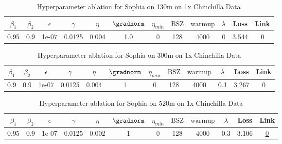 \begin{table}[H]
\centering
\caption{Hyperparameter ablation for Sophia on 130m on 1x Chinchilla Data}
\label{tab:ablation_sophia_130m_1}
\begin{tabular}{cccccccccccc}
\toprule
$\beta_1$ & $\beta_2$ & $\epsilon$ & $\gamma$ & $\eta$ & $\gradnorm$ & $\eta_{min}$ & $\mathrm{BSZ}$ & $\mathrm{warmup}$ & $\lambda$ & Loss & Link \\
\midrule
0.95 & 0.9 & 1e-07 & 0.0125 & 0.004 & 1.0 & 0 & 128 & 4000 & 0 & 3.544 & \href{https://wandb.ai/stanford-mercury/optimizer-scaling/runs/sweep-130m-2B-sophiag67fd60lr0.004-wd0-minlr0-warmup4000-b10.95--7bdb33}{0} \\
\midrule
\bottomrule
\end{tabular}
\end{table}

\begin{table}[H]
\centering
\caption{Hyperparameter ablation for Sophia on 300m on 1x Chinchilla Data}
\label{tab:ablation_sophia_300m_1}
\begin{tabular}{cccccccccccc}
\toprule
$\beta_1$ & $\beta_2$ & $\epsilon$ & $\gamma$ & $\eta$ & $\gradnorm$ & $\eta_{min}$ & $\mathrm{BSZ}$ & $\mathrm{warmup}$ & $\lambda$ & Loss & Link \\
\midrule
0.9 & 0.9 & 1e-07 & 0.0125 & 0.004 & 1 & 0 & 128 & 4000 & 0.1 & 3.267 & \href{https://wandb.ai/stanford-mercury/optimizer-scaling/runs/sweep-300m-6B-sophiafff382flr0.004-wd0.1-minlr0-warmup4000-b10.9-f1648d}{0} \\
\midrule
\bottomrule
\end{tabular}
\end{table}

\begin{table}[H]
\centering
\caption{Hyperparameter ablation for Sophia on 520m on 1x Chinchilla Data}
\label{tab:ablation_sophia_520m_1}
\begin{tabular}{cccccccccccc}
\toprule
$\beta_1$ & $\beta_2$ & $\epsilon$ & $\gamma$ & $\eta$ & $\gradnorm$ & $\eta_{min}$ & $\mathrm{BSZ}$ & $\mathrm{warmup}$ & $\lambda$ & Loss & Link \\
\midrule
0.95 & 0.9 & 1e-07 & 0.0125 & 0.002 & 1 & 0 & 128 & 4000 & 0.3 & 3.106 & \href{https://wandb.ai/stanford-mercury/optimizer-scaling/runs/sweep-520m-10B-sophia651c9blr0.002-wd0.3-minlr0-warmup4000-b10.9-46bf7a}{0} \\
\midrule
\bottomrule
\end{tabular}
\end{table}

